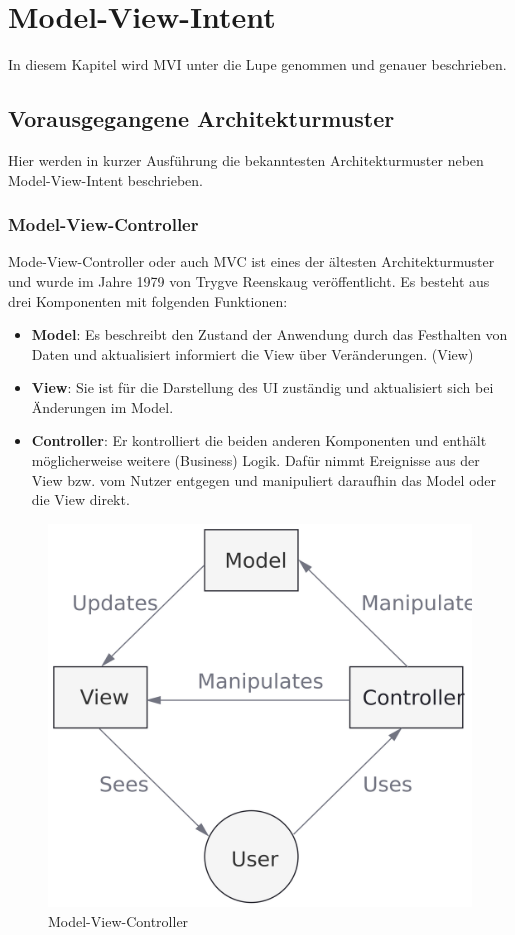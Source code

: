 \section{Model-View-Intent}
\label{sec:model-view-intent}
In diesem Kapitel wird MVI unter die Lupe genommen und genauer beschrieben.

\subsection{Vorausgegangene Architekturmuster}
Hier werden in kurzer Ausführung die bekanntesten Architekturmuster neben Model-View-Intent beschrieben.

\subsubsection{Model-View-Controller}
Mode-View-Controller oder auch MVC ist eines der ältesten Architekturmuster und wurde im Jahre 1979 von Trygve Reenskaug veröffentlicht.
\cite{theModelViewEditorTrygveReenskaug1979, modelsViewsControllersTrygveReenskaug1979}
Es besteht aus drei Komponenten mit folgenden Funktionen:
\begin{itemize}
	\item \textbf{Model}: Es beschreibt den Zustand der Anwendung durch das Festhalten von Daten und aktualisiert informiert die View über Veränderungen. (View)
	\item \textbf{View}: Sie ist für die Darstellung des UI zuständig und aktualisiert sich bei Änderungen im Model.
	\item \textbf{Controller}:  Er kontrolliert die beiden anderen Komponenten und enthält möglicherweise weitere (Business) Logik. Dafür nimmt Ereignisse aus der View bzw. vom Nutzer entgegen und manipuliert daraufhin das Model oder die View direkt. 
\end{itemize}
\begin{figure}[ht]
	\centering
	\includegraphics[height=0.5\textwidth]{./images/mvc-diagram.png}
	\caption{Model-View-Controller}
	\label{fig:mvc}
\end{figure}
\clearpage

